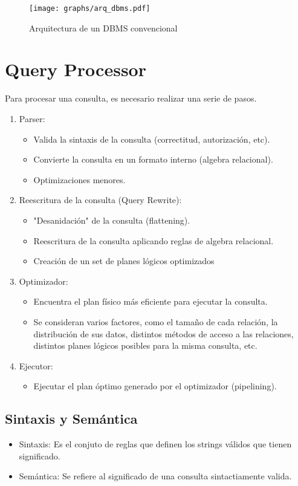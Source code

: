 \begin{figure}[h]
  \centering
  \texttt{[image: graphs/arq\_dbms.pdf]}
  \caption{Arquitectura de un DBMS convencional}
\end{figure}

\section{Query Processor}
Para procesar una consulta, es necesario realizar una serie de pasos.
\begin{enumerate}
  \item Parser:
  \begin{itemize}
    \item Valida la sintaxis de la consulta (correctitud, autorización, etc).
    \item Convierte la consulta en un formato interno (algebra relacional).
    \item Optimizaciones menores.
  \end{itemize}
  \item Reescritura de la consulta (Query Rewrite):
  \begin{itemize}
    \item "Desanidación" de la consulta (flattening).
    \item Reescritura de la consulta aplicando reglas de algebra relacional.
    \item Creación de un set de planes lógicos optimizados
  \end{itemize}
  \item Optimizador:
  \begin{itemize}
    \item Encuentra el plan físico más eficiente para ejecutar la consulta.
    \item Se consideran varios factores, como el tamaño de cada relación, la distribución de sus datos, distintos métodos de acceso a las relaciones, distintos planes lógicos posibles para la misma consulta, etc.
  \end{itemize}
  \item Ejecutor:
  \begin{itemize}
    \item Ejecutar el plan óptimo generado por el optimizador (pipelining).
  \end{itemize}
\end{enumerate}

\subsection{Sintaxis y Semántica}
\begin{itemize}
  \item Sintaxis: Es el conjuto de reglas que definen los strings válidos que tienen significado.
  \item Semántica: Se refiere al significado de una consulta sintactiamente valida.
\end{itemize}

